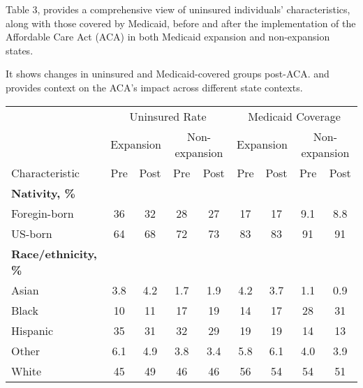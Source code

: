 \documentclass[
]{article}
\let\origtable\table
\let\endorigtable\endtable
\renewenvironment{table}[1][ht]{
      \expandafter\origtable\expandafter[H]
    }{
      \endorigtable
    }
\begin{document}
Table 3, provides a comprehensive view of uninsured individuals'
characteristics, along with those covered by Medicaid, before and after
the implementation of the Affordable Care Act (ACA) in both Medicaid
expansion and non-expansion states.

It shows changes in uninsured and Medicaid-covered groups post-ACA. and
provides context on the ACA's impact across different state contexts.

\begin{table}

\caption{\label{tab:tab3}Charachterstics of Uninsured and Medicaid Covered Low Income Indiduals, expansion vs non-expansion}
\centering
\fontsize{8}{10}\selectfont
\begin{tabular}[t]{lcccccccc}
\toprule
\multicolumn{1}{c}{ } & \multicolumn{4}{c}{Uninsured Rate} & \multicolumn{4}{c}{Medicaid Coverage} \\
\cmidrule(l{3pt}r{3pt}){2-5} \cmidrule(l{3pt}r{3pt}){6-9}
\multicolumn{1}{c}{ } & \multicolumn{2}{c}{Expansion} & \multicolumn{2}{c}{Non-expansion} & \multicolumn{2}{c}{Expansion} & \multicolumn{2}{c}{Non-expansion} \\
\cmidrule(l{3pt}r{3pt}){2-3} \cmidrule(l{3pt}r{3pt}){4-5} \cmidrule(l{3pt}r{3pt}){6-7} \cmidrule(l{3pt}r{3pt}){8-9}
Characteristic & Pre & Post & Pre & Post & Pre & Post & Pre & Post\\
\midrule
\textbf{Nativity, \%} &  &  &  &  &  &  &  & \\
\hspace{1em}Foregin-born & 36 & 32 & 28 & 27 & 17 & 17 & 9.1 & 8.8\\
\hspace{1em}US-born & 64 & 68 & 72 & 73 & 83 & 83 & 91 & 91\\
\textbf{Race/ethnicity, \%} &  &  &  &  &  &  &  & \\
\hspace{1em}Asian & 3.8 & 4.2 & 1.7 & 1.9 & 4.2 & 3.7 & 1.1 & 0.9\\
\hspace{1em}Black & 10 & 11 & 17 & 19 & 14 & 17 & 28 & 31\\
\hspace{1em}Hispanic & 35 & 31 & 32 & 29 & 19 & 19 & 14 & 13\\
\hspace{1em}Other & 6.1 & 4.9 & 3.8 & 3.4 & 5.8 & 6.1 & 4.0 & 3.9\\
\hspace{1em}White & 45 & 49 & 46 & 46 & 56 & 54 & 54 & 51\\

\end{tabular}
\end{table}
\end{document}
